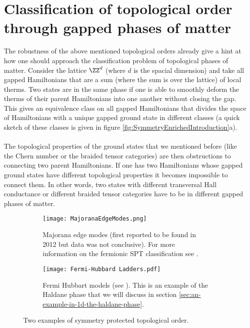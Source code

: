 \section{Classification of topological order through gapped phases of matter}
The robustness of the above mentioned topological orders already give a hint at how one should approach the classification problem of topological phases of matter. Consider the lattice $\ZZ^d$ (where $d$ is the spacial dimension) and take all gapped Hamiltonians that are a sum (where the sum is over the lattice) of local therms. Two states are in the same phase if one is able to smoothly deform the therms of their parent Hamiltonians into one another without closing the gap. This gives an equivalence class on all gapped Hamiltonians that divides the space of Hamiltonians with a unique gapped ground state in different classes (a quick sketch of these classes is given in figure \ref{fig:SymmetryEnrichedIntroduction}a).
\\\\
The topological properties of the ground states that we mentioned before (like the Chern number or the braided tensor categories) are then obstructions to connecting two parent Hamiltonians. If one has two Hamiltonians whose gapped ground states have different topological properties it becomes impossible to connect them. In other words, two states with different transversal Hall conductance or different braided tensor categories have to be in different gapped phases of matter.
\begin{figure}
	\begin{subfigure}[b]{0.45\textwidth}
		\centering
		\texttt{[image: MajoranaEdgeModes.png]}
		\caption{Majorana edge modes (first reported to be found in 2012 but data was not conclusive). For more information on the fermionic SPT classification see \cite{Bourne_2021}.}
	\end{subfigure}
	\hfil
	\begin{subfigure}[b]{0.45\textwidth}
		\centering
		\texttt{[image: Fermi-Hubbard Ladders.pdf]}
		\caption{Fermi Hubbart models (see \cite{sompet2022realizing}). This is an example of the Haldane phase that we will discuss in section \ref{sec:an-example-in-1d-the-haldane-phase}.}
	\end{subfigure}
	\caption{Two examples of symmetry protected topological order.}
	\label{fig:SymmetryProtectedTopologicalOrderFigures}
\end{figure}
